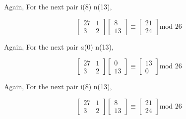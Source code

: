 \documentclass[a4paper,12pt]{article}
\begin{document}
    \begin{center}
    \end{center}

    Again, For the next pair i(8) n(13),

    \begin{equation*}
        \begin{bmatrix}
            27 & 1 \\
            3 & 2
        \end{bmatrix}
        \begin{bmatrix}
            8 \\
            13
        \end{bmatrix} \equiv \begin{bmatrix}
            21 \\
            24
        \end{bmatrix} \mbox{mod 26}
    \end{equation*}

    \begin{center}
    \end{center}

    \pagebreak

    Again, For the next pair $a$(0) n(13),

    \begin{equation*}
        \begin{bmatrix}
            27 & 1 \\
            3 & 2
        \end{bmatrix}
        \begin{bmatrix}
            0 \\
            13
        \end{bmatrix} \equiv \begin{bmatrix}
            13 \\
            0
        \end{bmatrix} \mbox{mod 26}
    \end{equation*}

    \begin{center}
    \end{center}

    Again, For the next pair i(8) n(13),

    \begin{equation*}
        \begin{bmatrix}
            27 & 1 \\
            3 & 2
        \end{bmatrix}
        \begin{bmatrix}
            8 \\
            13
        \end{bmatrix} \equiv \begin{bmatrix}
            21 \\
            24
        \end{bmatrix} \mbox{mod 26}
    \end{equation*}
\end{document}
